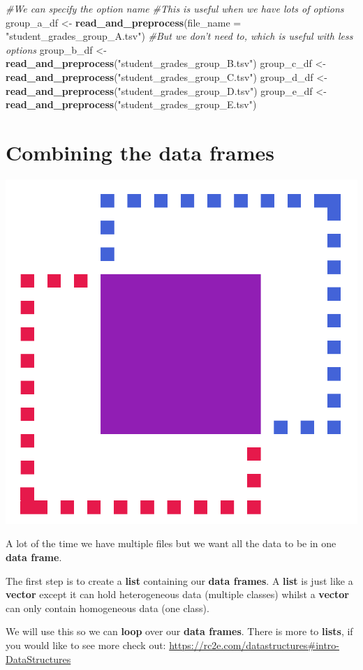 \documentclass[]{book}
\newenvironment{Shaded}{\begin{snugshade}}{\end{snugshade}}
\newcommand{\KeywordTok}[1]{\textcolor[rgb]{0.13,0.29,0.53}{\textbf{#1}}}
\newcommand{\DataTypeTok}[1]{\textcolor[rgb]{0.13,0.29,0.53}{#1}}
\newcommand{\StringTok}[1]{\textcolor[rgb]{0.31,0.60,0.02}{#1}}
\newcommand{\CommentTok}[1]{\textcolor[rgb]{0.56,0.35,0.01}{\textit{#1}}}
\newcommand{\NormalTok}[1]{#1}
\begin{document}
\begin{Shaded}
\begin{Highlighting}[]
\CommentTok{#We can specify the option name}
\CommentTok{#This is useful when we have lots of options}
\NormalTok{group_a_df <-}\StringTok{ }\KeywordTok{read_and_preprocess}\NormalTok{(}\DataTypeTok{file_name =} \StringTok{"student_grades_group_A.tsv"}\NormalTok{)}
\CommentTok{#But we don't need to, which is useful with less options}
\NormalTok{group_b_df <-}\StringTok{ }\KeywordTok{read_and_preprocess}\NormalTok{(}\StringTok{"student_grades_group_B.tsv"}\NormalTok{)}
\NormalTok{group_c_df <-}\StringTok{ }\KeywordTok{read_and_preprocess}\NormalTok{(}\StringTok{"student_grades_group_C.tsv"}\NormalTok{)}
\NormalTok{group_d_df <-}\StringTok{ }\KeywordTok{read_and_preprocess}\NormalTok{(}\StringTok{"student_grades_group_D.tsv"}\NormalTok{)}
\NormalTok{group_e_df <-}\StringTok{ }\KeywordTok{read_and_preprocess}\NormalTok{(}\StringTok{"student_grades_group_E.tsv"}\NormalTok{)}
\end{Highlighting}
\end{Shaded}

\section{Combining the data frames}\label{combining-the-data-frames}

\begin{center}\includegraphics[width=0.2\linewidth]{figures/combine} \end{center}

A lot of the time we have multiple files but we want all the data to be
in one \textbf{data frame}.

The first step is to create a \textbf{list} containing our \textbf{data
frames}. A \textbf{list} is just like a \textbf{vector} except it can
hold heterogeneous data (multiple classes) whilst a \textbf{vector} can
only contain homogeneous data (one class).

We will use this so we can \textbf{loop} over our \textbf{data frames}.
There is more to \textbf{lists}, if you would like to see more check
out: \url{https://rc2e.com/datastructures\#intro-DataStructures}
\end{document}
